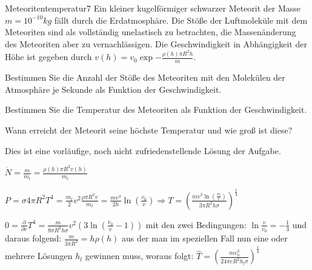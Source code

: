 \begin{problem}{Meteoritentemperatur}{7}
Ein kleiner kugelförmiger schwarzer Meteorit der Masse $m=10^{-10}\unit{kg}$ fällt durch die Erdatmosphäre.
Die Stöße der Luftmoleküle mit dem Meteoriten sind als vollständig unelastisch zu betrachten, die Massenänderung des Meteoriten aber zu vernachlässigen.
Die Geschwindigkeit in Abhängigkeit der Höhe ist gegeben durch $v(h)=v_0\exp{-\frac{\rho(h)\pi R^2h}{m}}$.
 \begin{abcenum}
  \item Bestimmen Sie die Anzahl der Stöße des Meteoriten mit den Molekülen der Atmosphäre je Sekunde als Funktion der Geschwindigkeit.
  \item Bestimmen Sie die Temperatur des Meteoriten als Funktion der Geschwindigkeit.
  \item Wann erreicht der Meteorit seine höchste Temperatur und wie groß ist diese?
 \end{abcenum}
\begin{solution}
Dies ist eine vorläufige, noch nicht zufriedenstellende Lösung der Aufgabe.
\begin{abcenum}
\item $\dot{N}=\frac{\dot{m}}{m_t}=\frac{\rho(h) \pi R^2 v(h)}{m_t}$
\item $P=\sigma 4\pi R^2 T^4=\frac{m_t}2v^2\frac{\rho \pi R^2 v}{m_t}=\frac{mv^3}{2h}\ln{\left(\frac{v_0}{v}\right)} \Rightarrow T=\left(\frac{mv^3\ln{\left(\frac{v_0}{v}\right)}}{3\pi R^2h\sigma}\right)^{\frac 14}$
\item  $0=\frac {\partial}{\partial v}T^4=\frac{m}{8\pi R^2h\sigma}v^2\left(3\ln\left(\frac{v_0}{v}-1\right)\right)$ mit den zwei Bedingungen: $\ln\frac{v}{v_0}=-\frac 13$ und daraus folgend: $\frac{m}{3\pi R^2}=h\rho(h)$ aus der man im speziellen Fall nun eine oder mehrere Lösungen $h_l$ gewinnen muss, woraus folgt: $\hat{T}=\left(\frac{mv_0^3}{24\pi e R^2h_l\sigma}\right)^{\frac 14}$
\end{abcenum}
\end{solution}
\end{problem}

